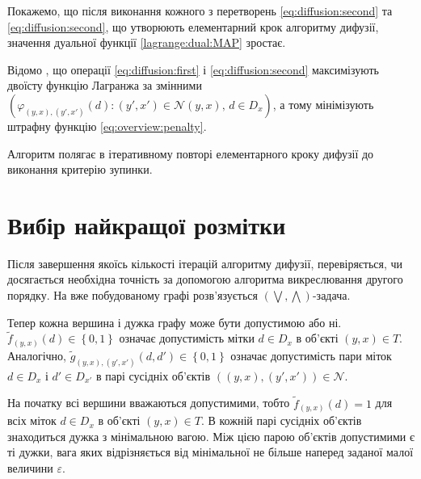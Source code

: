 Покажемо, що після виконання кожного з перетворень \eqref{eq:diffusion:second}
та \eqref{eq:diffusion:second},
що утворюють елементарний крок алгоритму дифузії,
значення дуальної функції \eqref{lagrange:dual:MAP} зростає.


Відомо \cite{overview:savchynskyy:diffusion},
що операції \ref{eq:diffusion:first} і
\ref{eq:diffusion:second} максимізують двоїсту функцію Лагранжа за змінними
$\left(
    \varphi_{\left(y, x \right), \left(y', x' \right)} \left(d \right) :
    \left(y', x' \right) \in \mathcal{N} \left(y, x \right), \,
    d \in D_x
\right)$, а тому мінімізують штрафну функцію \ref{eq:overview:penalty}.

Алгоритм полягає в ітеративному повторі елементарного кроку дифузії до виконання
критерію зупинки.

\section{Вибір найкращої розмітки}


Після завершення якоїсь кількості ітерацій алгоритму дифузії,
перевіряється, чи досягається необхідна точність за допомогою
алгоритма викреслювання другого порядку.
На вже побудованому графі розв'язується
$\left( \bigvee, \bigwedge \right)$-задача.


Тепер кожна вершина і дужка графу може бути допустимою або ні.
$\tilde{f}_{\left(y, x \right)} \left(d \right) \in \left\{ 0, 1 \right\}$
означає допустимість мітки
$d \in D_x$ в об'єкті $\left(y,x \right) \in T$.
Аналогічно,
$\tilde{g}_{\left(y,x \right), \left(y', x' \right)} \left(d, d' \right)
    \in \left\{ 0, 1 \right\}$
означає допустимість пари міток $d \in D_x$ і $d' \in D_{x'}$
в парі сусідніх об'єктів
$\left( \left(y,x \right), \left(y', x' \right) \right) \in \mathcal{N}$.

На початку всі вершини вважаються допустимими, тобто
$\tilde{f}_{\left(y, x \right)} \left(d \right) = 1$ для всіх
міток $d \in D_x$ в об'єкті $\left(y,x \right) \in T$.
В кожній парі сусідніх об'єктів знаходиться дужка з мінімальною вагою.
Між цією парою об'єктів допустимими є ті дужки,
вага яких відрізняється від мінімальної не більше
наперед заданої малої величини $\varepsilon$.

